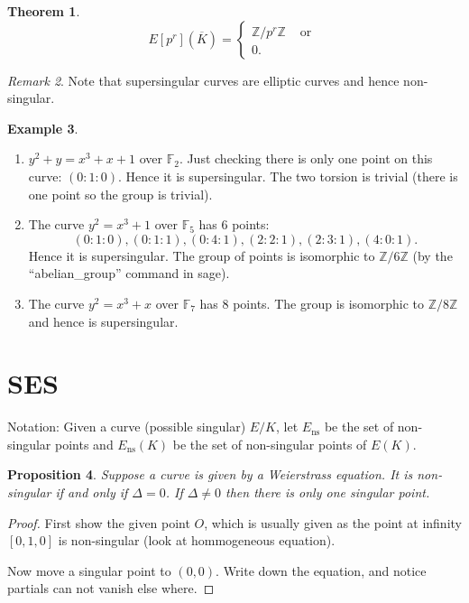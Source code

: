 \documentclass[11pt]{article}
\newcommand{\BB}[1]{\mathbb{#1}} %
\newcommand{\ZZ}{\BB{Z}}
\newcommand{\FF}{\BB{F}}
\newcommand{\ns}{\operatorname{ns}}
\theoremstyle{plain}%
\newtheorem{thm}{Theorem}[section]
\newtheorem{prop}[thm]{Proposition}
\theoremstyle{definition}
\newtheorem{ex}[thm]{Example}
\theoremstyle{remark}
\newtheorem{rem}[thm]{Remark}
\begin{document}
\begin{thm}
	$$
	E[p^r](\overline{K})
	=
	\begin{cases}
		\ZZ/p^r\ZZ &\text{ or }
		\\
		0.
	\end{cases}
	$$
\end{thm}

\begin{rem} %
	Note that supersingular curves are elliptic curves and hence non-singular.
\end{rem}

\begin{ex}
	\hfill
	\begin{enumerate}[$\bullet$]
		\item $y^2+y=x^3+x+1$ over $\FF_2$. Just checking there is only one point on this curve: $(0 : 1 : 0)$. Hence it is supersingular. The two torsion is trivial (there is one point so the group is trivial).

		\item The curve $y^2=x^3+1$ over $\FF_5$ has 6 points:
		$$
		(0 : 1 : 0), (0 : 1 : 1), (0 : 4 : 1), (2 : 2 : 1), (2 : 3 : 1), (4 : 0 : 1).
		$$
		Hence it is supersingular. The group of points is isomorphic to $\ZZ/6\ZZ$ (by the ``abelian\_group'' command in sage).

		\item The curve $y^2 = x^3 + x$ over $\FF_7$ has 8 points. The group is isomorphic to $\ZZ/8\ZZ$ and hence is supersingular.
	\end{enumerate}
\end{ex}

\section{SES}

Notation: Given a curve (possible singular) $E/K$, let $E_{\ns}$ be the set of non-singular points and $E_{\ns}(K)$ be the set of non-singular points of $E(K)$.

\begin{prop} %
	Suppose a curve is given by a Weierstrass equation. It is non-singular if and only if $\Delta=0$. If $\Delta\neq 0$ then there is only one singular point.
\end{prop}
\begin{proof}
	First show the given point $O$, which is usually given as the point at infinity $[0,1,0]$ is non-singular (look at hommogeneous equation).

	Now move a singular point to $(0,0)$. Write down the equation, and notice partials can not vanish else where.
\end{proof}
\end{document}

